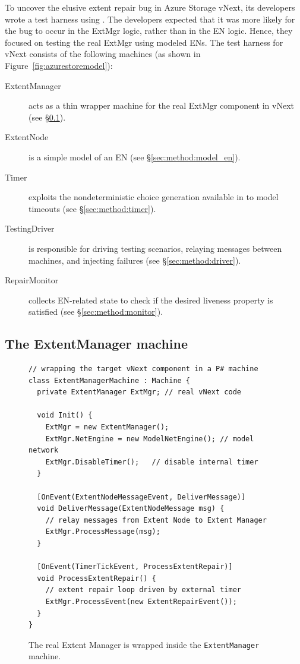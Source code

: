 To uncover the elusive extent repair bug in Azure Storage vNext, its developers wrote a test harness using \psharp. The developers expected that it was more likely for the bug to occur in the ExtMgr logic, rather than in the EN logic. Hence, they focused on testing the real ExtMgr using modeled ENs. The test harness for vNext consists of the following \psharp machines (as shown in Figure~\ref{fig:azurestoremodel}):

\begin{description}
\item[ExtentManager] acts as a thin wrapper machine for the real ExtMgr component in vNext (see \S\ref{sec:method:wrap_target}).

\item[ExtentNode] is a simple model of an EN (see \S\ref{sec:method:model_en}).

\item[Timer] exploits the nondeterministic choice generation available in \psharp to model timeouts (see \S\ref{sec:method:timer}).

\item[TestingDriver] is responsible for driving testing scenarios, relaying messages between machines, and injecting failures (see \S\ref{sec:method:driver}).

\item[RepairMonitor] collects EN-related state to check if the desired liveness property is satisfied (see \S\ref{sec:method:monitor}).
\end{description}

\subsection{The ExtentManager machine}
\label{sec:method:wrap_target}

\begin{figure}[t]
\begin{lstlisting}
// wrapping the target vNext component in a P# machine
class ExtentManagerMachine : Machine {
  private ExtentManager ExtMgr; // real vNext code

  void Init() {
    ExtMgr = new ExtentManager();
    ExtMgr.NetEngine = new ModelNetEngine(); // model network
    ExtMgr.DisableTimer();	 // disable internal timer
  }

  [OnEvent(ExtentNodeMessageEvent, DeliverMessage)]
  void DeliverMessage(ExtentNodeMessage msg) {
    // relay messages from Extent Node to Extent Manager
    ExtMgr.ProcessMessage(msg);
  }
	
  [OnEvent(TimerTickEvent, ProcessExtentRepair)]
  void ProcessExtentRepair() {
    // extent repair loop driven by external timer
    ExtMgr.ProcessEvent(new ExtentRepairEvent());
  }
}
\end{lstlisting}
\vspace{-3mm}
\caption{The real Extent Manager is wrapped inside the \texttt{ExtentManager} \psharp machine.}
\label{fig:wrap_target}
\vspace{-3mm}
\end{figure}

